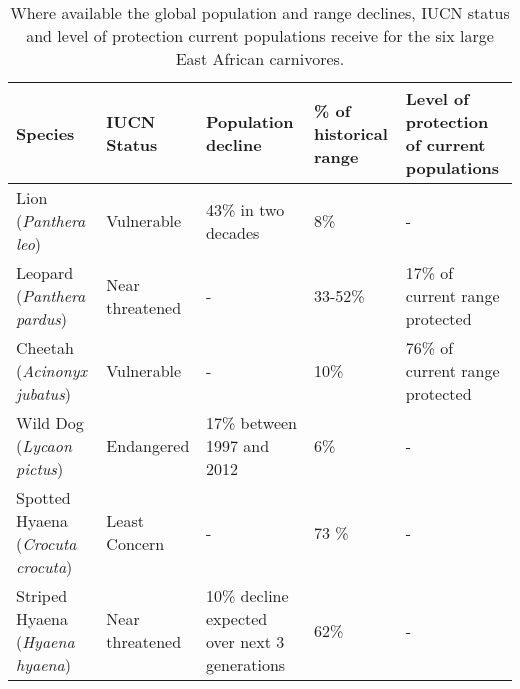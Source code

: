 
\begin{table}[h]
	\small
	\begin{center}
		\begin{tabular}{p{2.1cm} p{2.7cm} p{3cm} p{3cm} p{3cm}}
			\hline \hline		
			Species 			& IUCN Status			& Population decline 	& \% of historical range & Level of protection of current populations\\ \hline
			Lion	 (\textit{Panthera leo})				& Vulnerable 		& 43\% in two decades 		& 8\% 		& - \\
			Leopard 	(\textit{Panthera pardus})		& Near threatened 	& -	 						& 33-52\% 	&17\% of current range protected\\
			Cheetah (\textit{Acinonyx jubatus})		& Vulnerable			& - 							& 10\% 		& 76\% of current range protected\\
			Wild Dog (\textit{Lycaon pictus})		& Endangered			& 17\% between 1997 and 2012	& 6\%		& - \\
			Spotted Hyaena (\textit{Crocuta crocuta})& Least Concern		& - 							& 73	\%		& - \\
			Striped Hyaena (\textit{Hyaena hyaena})	& Near threatened	& 10\% decline expected over next 3 generations & 62\% & - \\
			\hline \hline						
		\end{tabular}
		\caption{Where available the global population and range declines, IUCN status and level of protection current populations receive for the six large East African carnivores\citep{Loe2004a,Woodroffe2012a,iucn2007regional,Bauer2016,jacobson2016leopard,AbiSaid2015,Bohm2015,IUCN2016,Ray2005,Durant2015}.}
	\label{table:EACarn}
	\end{center}
\end{table}

